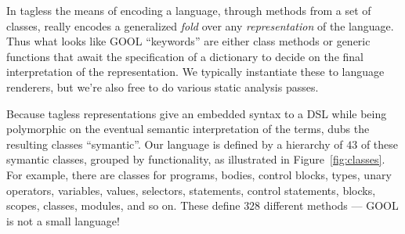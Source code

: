 \documentclass[sigplan,review,anonymous,prologue,dvipsnames]{acmart}
\begin{document}
In tagless the means of encoding a language,
through methods from a set of classes, really encodes a generalized
\emph{fold} over any \emph{representation} of the language.  Thus what
looks like GOOL ``keywords'' are either class methods or generic functions
that await the specification of a dictionary to decide on the final
interpretation of the representation.  We typically instantiate these to
language renderers, but we're also free to do various static analysis passes.

Because tagless representations give an embedded syntax to a DSL while
being polymorphic on the eventual semantic interpretation of the terms,
\cite{carette2009finally} dubs the resulting classes ``symantic''.
Our language is defined by a hierarchy of $43$ of these symantic classes,
grouped by functionality, as illustrated in Figure~\ref{fig:classes}.  
For example, there are classes for programs,
bodies, control blocks, types, unary operators, variables, values, selectors,
statements, control statements, blocks, scopes, classes, modules, and so
on.  These define $328$ different methods --- GOOL is not a small language!
\end{document}
